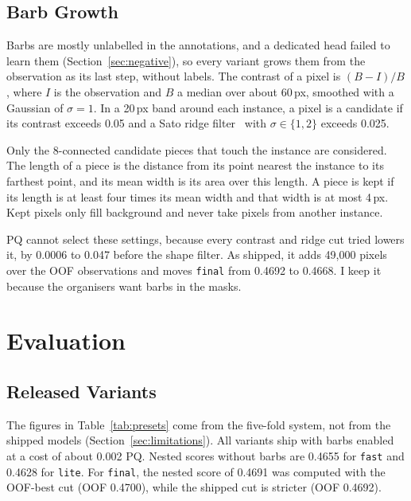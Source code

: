 \documentclass[sigconf,pbalance]{acmart}
\begin{document}
    \subsection{Barb Growth}\label{subsec:barbs}
    Barbs are mostly unlabelled in the annotations, and a dedicated head failed to learn them (Section~\ref{sec:negative}), so every variant grows them from the observation as its last step, without labels.
    The contrast of a pixel is $(B-I)/B$, where $I$ is the observation and $B$ a median over about 60\,px, smoothed with a Gaussian of $\sigma=1$.
    In a 20\,px band around each instance, a pixel is a candidate if its contrast exceeds 0.05 and a Sato ridge filter~\cite{sato1998line} with $\sigma\in\{1,2\}$ exceeds 0.025.

    Only the 8-connected candidate pieces that touch the instance are considered.
    The length of a piece is the distance from its point nearest the instance to its farthest point, and its mean width is its area over this length.
    A piece is kept if its length is at least four times its mean width and that width is at most 4\,px.
    Kept pixels only fill background and never take pixels from another instance.

    PQ cannot select these settings, because every contrast and ridge cut tried lowers it, by 0.0006 to 0.047 before the shape filter.
    As shipped, it adds 49{,}000 pixels over the OOF observations and moves \texttt{final} from 0.4692 to 0.4668.
    I keep it because the organisers want barbs in the masks.


\section{Evaluation}\label{sec:evaluation}
    \subsection{Released Variants}\label{subsec:variants}
    The figures in Table~\ref{tab:presets} come from the five-fold system, not from the shipped models (Section~\ref{sec:limitations}).
    All variants ship with barbs enabled at a cost of about 0.002 PQ\@.
    Nested scores without barbs are 0.4655 for \texttt{fast} and 0.4628 for \texttt{lite}.
    For \texttt{final}, the nested score of 0.4691 was computed with the OOF-best cut (OOF 0.4700), while the shipped cut is stricter (OOF 0.4692).
\end{document}
